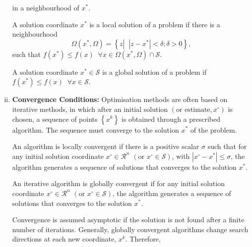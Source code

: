 \begin{enumerate}[i)]
\begin{lem}
{\begin{enumerate}[(a)]
    \end{enumerate}}
 in a neighbourhood of $x^{\ast}$.
\end{lem}

\begin{defn}
   A solution coordinate $x^{\ast}$ is a local solution of a problem if there is a neighbourhood 
   \begin{displaymath}
           \Omega\left(x^{\ast},\Omega\right) = \left\{ z \left|\;\;\left|z-x^{\ast}\right| < \delta ; \delta > 0\right.\right\},
   \end{displaymath}
   such that $f\left(x^{\ast}\right)\leq f\left(x\right)\;\;\forall x\in\Omega\left(x^{\ast},\Omega\right) \cap \mathcal{S}$.
\end{defn}

\begin{defn}
   A solution coordinate $x^{\ast}\in\mathcal{S}$ is a global solution of a problem if $f\left(x^{\ast}\right)\leq f\left(x\right)\;\;\forall x\in\mathcal{S}$.
\end{defn}

\item {\bf Convergence Conditions:} Optimisation methods are often based on iterative methods, in which after an initial solution $\left(\text{or estimate}, x^{\circ}\right)$ is chosen, a sequence of points $\left\{x^{k}\right\}$ is obtained through a prescribed algorithm. The sequence must converge to the solution $x^{\ast}$ of the problem.
\begin{defn}
   An algorithm is locally convergent if there is a positive scalar $\sigma$ such that for any initial solution coordinate $x^{\circ}\in\mathcal{R}^{n}$ $\left(\text{or } x^{\circ}\in\mathcal{S}\right)$, with $\left|x^{\circ}-x^{\ast}\right|\leq\sigma$, the algorithm generates a sequence of solutions that converges to the solution $x^{\ast}$.
\end{defn}

\begin{defn}
   An iterative algorithm is globally convergent if for any initial solution coordinate $x^{\circ}\in\mathcal{R}^{n}$ $\left(\text{or } x^{\circ}\in\mathcal{S}\right)$, the algorithm generates a sequence of solutions that converges to the solution $x^{\ast}$.
\end{defn}

\bigskip
Convergence is assumed asymptotic if the solution is not found after a finite number of iterations. Generally, globally convergent algorithms change search directions at each new coordinate, $x^{k}$. Therefore,


\end{enumerate}
